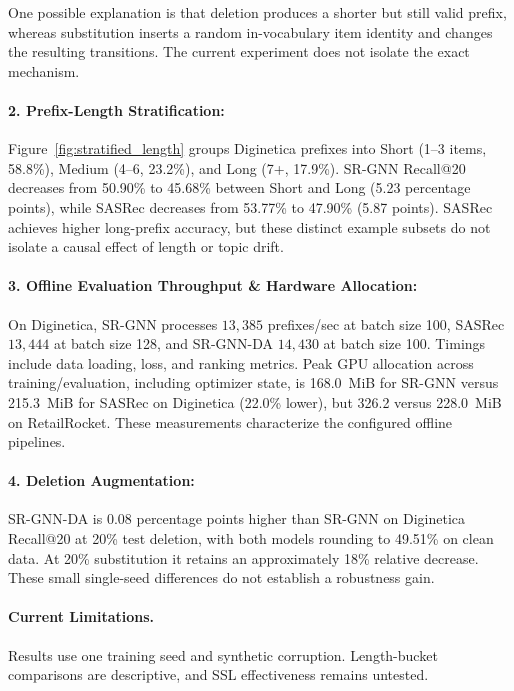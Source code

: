 \documentclass[11pt]{article}
\begin{document}
One possible explanation is that deletion produces a shorter but still valid prefix, whereas substitution inserts a random in-vocabulary item identity and changes the resulting transitions. The current experiment does not isolate the exact mechanism.

\paragraph{2. Prefix-Length Stratification:}
Figure~\ref{fig:stratified_length} groups Diginetica prefixes into Short (1--3 items, 58.8\%), Medium (4--6, 23.2\%), and Long (7+, 17.9\%). SR-GNN Recall@20 decreases from 50.90\% to 45.68\% between Short and Long (5.23 percentage points), while SASRec decreases from 53.77\% to 47.90\% (5.87 points). SASRec achieves higher long-prefix accuracy, but these distinct example subsets do not isolate a causal effect of length or topic drift.

\paragraph{3. Offline Evaluation Throughput \& Hardware Allocation:}
On Diginetica, SR-GNN processes $13{,}385$ prefixes/sec at batch size 100, SASRec $13{,}444$ at batch size 128, and SR-GNN-DA $14{,}430$ at batch size 100. Timings include data loading, loss, and ranking metrics. Peak GPU allocation across training/evaluation, including optimizer state, is 168.0~MiB for SR-GNN versus 215.3~MiB for SASRec on Diginetica (22.0\% lower), but 326.2 versus 228.0~MiB on RetailRocket. These measurements characterize the configured offline pipelines.

\paragraph{4. Deletion Augmentation:}
SR-GNN-DA is 0.08 percentage points higher than SR-GNN on Diginetica Recall@20 at 20\% test deletion, with both models rounding to 49.51\% on clean data. At 20\% substitution it retains an approximately 18\% relative decrease. These small single-seed differences do not establish a robustness gain.

\paragraph{Current Limitations.} Results use one training seed and synthetic corruption. Length-bucket comparisons are descriptive, and SSL effectiveness remains untested.
\end{document}
